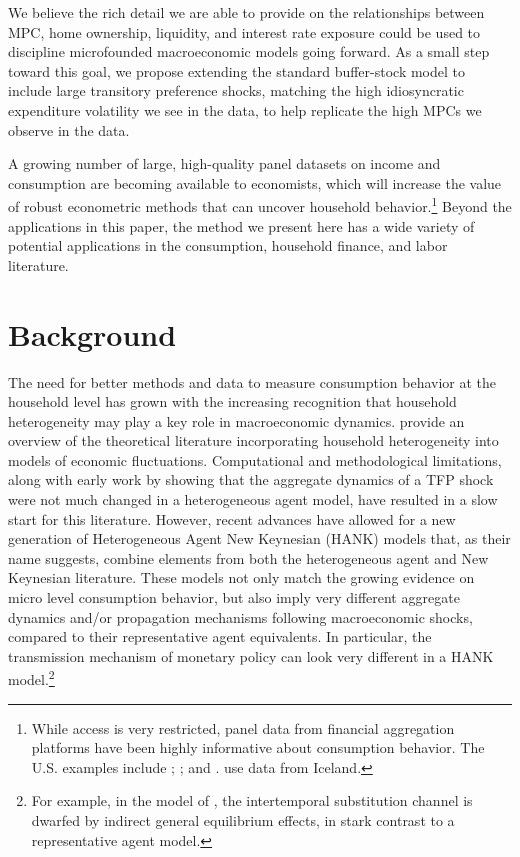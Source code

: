 \documentclass[titlepage]{\econtex}\newcommand{\texname}{ConsumptionHeterogeneity}
\begin{document}
We believe the rich detail we are able to provide on the relationships between MPC, home ownership, liquidity, and interest rate exposure could be used to discipline microfounded macroeconomic models going forward. As a small step toward this goal, we propose extending the standard buffer-stock model to include large transitory preference shocks, matching the high idiosyncratic expenditure volatility we see in the data, to help replicate the high MPCs we observe in the data. 

A growing number of large, high-quality panel datasets on income and consumption are becoming available to economists, which will increase the value of robust econometric methods that can uncover household behavior.\footnote{While access is very restricted, panel data from financial aggregation platforms have been highly informative about consumption behavior. The U.S. examples include \cite{gelman_harnessing_2014}; \cite{ganong_consumer_2017}; and \cite{baker_debt_2015}. \cite{vardardottir_liquid_2016} use data from Iceland.} Beyond the applications in this paper, the method we present here has a wide variety of potential applications in the consumption, household finance, and labor literature.

\section{Background}
The need for better methods and data to measure consumption behavior at the household level has grown with the increasing recognition that household heterogeneity may play a key role in macroeconomic dynamics. \cite{kaplan_microeconomic_2018} provide an overview of the theoretical literature incorporating household heterogeneity into models of economic fluctuations. Computational and methodological limitations, along with early work by \cite{krusell_income_1998} showing that the aggregate dynamics of a TFP shock were not much changed in a heterogeneous agent model, have resulted in a slow start for this literature. However, recent advances have allowed for a new generation of Heterogeneous Agent New Keynesian (HANK) models that, as their name suggests, combine elements from both the heterogeneous agent and New Keynesian literature. These models not only match the growing evidence on micro level consumption behavior, but also imply very different aggregate dynamics and/or propagation mechanisms following macroeconomic shocks, compared to their representative agent equivalents. In particular, the transmission mechanism of monetary policy can look very different in a HANK model.\footnote{For example, in the model of \cite{kaplan_monetary_2016}, the intertemporal substitution channel is dwarfed by indirect general equilibrium effects, in stark contrast to a representative agent model.}
\end{document}

